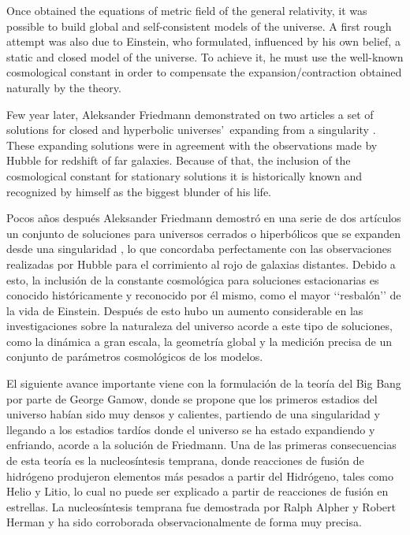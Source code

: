 Once obtained the equations of metric field of the general relativity, it 
was possible to build global and self-consistent models of the universe.
A first rough attempt was also due to Einstein, who formulated, influenced
by his own belief, a static and closed model of the universe. To achieve it,
he must use the well-known cosmological constant in order to compensate the
expansion/contraction obtained naturally by the theory.


Few year later, Aleksander Friedmann demonstrated on two articles a 
set of solutions for closed and hyperbolic universes'\ expanding from a
singularity \cite{FriedmanA} \cite{FriedmanB}. These expanding solutions 
were in agreement with the observations made by Hubble for redshift of 
far galaxies. Because of that, the inclusion of the cosmological constant 
for stationary solutions it is historically known and recognized by himself 
as the biggest blunder of his life.

Pocos años después Aleksander Friedmann demostró en una serie de dos 
artículos un conjunto de soluciones para universos cerrados o hiperbólicos
que se expanden desde una singularidad \cite{FriedmanA} \cite{FriedmanB}, 
lo que concordaba perfectamente con las observaciones realizadas por Hubble 
para el corrimiento al rojo de galaxias distantes. Debido a esto, la 
inclusión de la constante cosmológica para soluciones estacionarias es 
conocido históricamente y reconocido por él mismo, como el mayor ‘‘resbalón’’ 
de la vida de Einstein. Después de esto hubo un aumento considerable en las 
investigaciones sobre la naturaleza del universo acorde a este tipo de 
soluciones, como la dinámica a gran escala, la geometría global y la 
medición precisa de un conjunto de parámetros cosmológicos de los modelos.


El siguiente avance importante viene con la formulación de la teoría del 
Big Bang por parte de George Gamow, donde se propone que los primeros
estadios del universo habían sido muy densos y calientes, partiendo de una
singularidad y llegando a los estadios tardíos donde el universo se ha 
estado expandiendo y enfriando, acorde a la solución de Friedmann. Una
de las primeras consecuencias de esta teoría es la nucleosíntesis temprana,
donde reacciones de fusión de hidrógeno produjeron elementos más pesados 
a partir del Hidrógeno, tales como Helio y Litio, lo cual no puede ser 
explicado a partir de reacciones de fusión en estrellas. La nucleosíntesis
temprana fue demostrada por Ralph Alpher y Robert Herman y ha sido 
corroborada observacionalmente de forma muy precisa.

